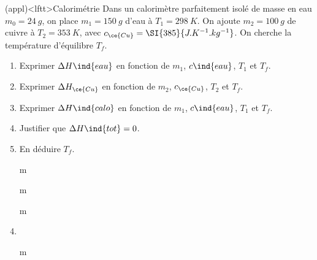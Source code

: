 \documentclass[a4paper, 11pt]{book}
\begin{document}
\begin{tcb*}(appl)<lftt>{Calorimétrie}
	Dans un calorimètre parfaitement isolé de masse en eau $m_0 = \SI{24}{g}$, on
	place $m_1 = \SI{150}{g}$ d'eau à $T_1 = \SI{298}{K}$. On ajoute $m_2 =
		\SI{100}{g}$ de cuivre à $T_2 = \SI{353}{K}$, avec $c_{\ce{Cu}} =
		\SI{385}{J.K^{-1}.kg^{-1}}$. On cherche la température d'équilibre $T_f$.
	\begin{enumerate}[label=\sqenumi]
		\item Exprimer $\Delta{H}\ind{eau}$ en fonction de $m_1$, $c\ind{eau}$,
		      $T_1$ et $T_f$.
		\item Exprimer $\Delta{H}_{\ce{Cu}}$ en fonction de $m_2$, $c_{\ce{Cu}}$,
		      $T_2$ et $T_f$.
		\item Exprimer $\Delta{H}\ind{calo}$ en fonction de $m_1$, $c\ind{eau}$,
		      $T_1$ et $T_f$.
		\item Justifier que $\Delta{H}\ind{tot} = 0$.
		\item En déduire $T_f$.
	\end{enumerate}
	\tcblower
	\begin{enumerate}[label=\sqenumi]
		\item[m]
			\vspace{-25pt}
		\item[m]
			\vspace{-25pt}
		\item[m]
			\vspace{-25pt}
		\item {}%
		\item[m]
	\end{enumerate}
	\vspace{-25pt}
\end{tcb*}
\end{document}
